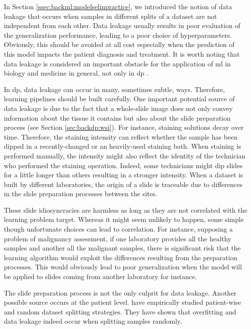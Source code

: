In Section \ref{ssec:backml:modelselinpractice}, we introduced the notion of data leakage that occurs when samples in different splits of a dataset are not independent from each other. Data leakage usually results in poor evaluation of the generalization performance, leading to a poor choice of hyperparameters. Obviously, this should be avoided at all cost especially when the prediction of this model impacts the patient diagnosis and treatment. It is worth noting that data leakage is considered an important obstacle for the application of \acrlong{ml} in biology and medicine in general, not only in \acrlong{dp} \cite{ching2018opportunities}. 

In \acrlong{dp}, data leakage can occur in many, sometimes subtle, ways. Therefore, learning pipelines should be built carefully. One important potential source of data leakage is due to the fact that a whole-slide image does not only convey information about the tissue it contains but also about the slide preparation process (see Section \ref{sec:backdp:wsi}). For instance, staining solutions decay over time. Therefore, the staining intensity can reflect whether the sample has been dipped in a recently-changed or an heavily-used staining bath. When staining is performed manually, the intensity might also reflect the identity of the technician who performed the staining operation. Indeed, some technicians might dip slides for a little longer than others resulting in a stronger intensity. When a dataset is built by different laboratories, the origin of a slide is traceable due to differences in the slide preparation processes between the sites. 

These slide idiosyncracies are harmless as long as they are not correlated with the learning problem target. Whereas it might seem unlikely to happen, some simple though unfortunate choices can lead to correlation. For instance, supposing a problem of malignancy assessment, if one laboratory provides all the healthy samples and another all the malignant samples, there is significant risk that the learning algorithm would exploit the differences resulting from the preparation processes. This would obviously lead to poor generalization when the model will be applied to slides coming from another laboratory for instance. 

The slide preparation process is not the only culprit for data leakage. Another possible source occurs at the patient level. \citeauthor{bussola2021ai} \cite{bussola2021ai} have empirically studied patient-wise and random dataset splitting strategies. They have shown that overfitting and data leakage indeed occur when splitting samples randomly.

